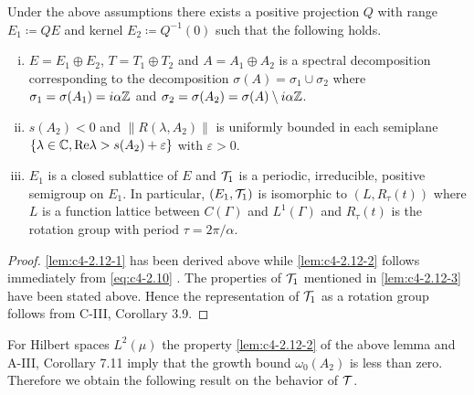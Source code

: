 \begin{lemma}\label{lem:c4-2.12}
Under the above assumptions there exists a positive projection $Q$ with range $E_{1} \coloneqq QE$ and kernel $E_{2} \coloneqq Q^{-1}(0)$ such that the following holds.

\begin{enumerate}[(i)]
\item \label{lem:c4-2.12-1}
$E = E_{1} \oplus E_{2}$, $T = T_{1} \oplus T_{2}$ and $A = A_{1} \oplus A_{2}$ is a spectral decomposition corresponding to the decomposition $\sigma(A) = \sigma_{1} \cup \sigma_{2}$ where $\sigma_{1} = \sigma(A_{1}) = i\alpha\mathbb{Z}$ and $\sigma_{2} = \sigma(A_{2}) = \sigma(A) \setminus i\alpha\mathbb{Z}$.


\item \label{lem:c4-2.12-2}
$s(A_{2}) < 0$ and $\|R(\lambda,A_{2})\|$ is uniformly bounded in each semiplane $\{\lambda \in \mathbb{C}, \mathop{}\!\mathrm{Re}\lambda > s(A_{2}) + \varepsilon\}$ with $\varepsilon > 0$.
\item \label{lem:c4-2.12-3}
$E_{1}$ is a closed sublattice of $E$ and $\mathcal{T}_{1}$ is a periodic, irreducible, positive semigroup on $E_{1}$.
In particular, $(E_{1},\mathcal{T}_{1})$ is isomorphic to $(L,R_{\tau}(t))$ where $L$ is a function lattice between $C(\Gamma)$ and $L^{1}(\Gamma)$ and $R_{\tau}(t)$ is the rotation group with period $\tau = 2\pi/\alpha$.
\end{enumerate}
\end{lemma}

\begin{proof}
\ref{lem:c4-2.12-1} has been derived above while \ref{lem:c4-2.12-2} follows immediately from \eqref{eq:c4-2.10}  .
The properties of $\mathcal{T}_{1}$ mentioned in \ref{lem:c4-2.12-3} have been stated above.
Hence the representation of $\mathcal{T}_{1}$ as a rotation group follows from C-III, Corollary 3.9.
\end{proof}

For Hilbert spaces $L^{2}(\mu)$ the property \ref{lem:c4-2.12-2} of the above lemma and A-III, Corollary 7.11 imply that the growth bound $\omega_{0}(A_{2})$ is less than zero.
Therefore we obtain the following result on the behavior of $\mathcal{T}$.

